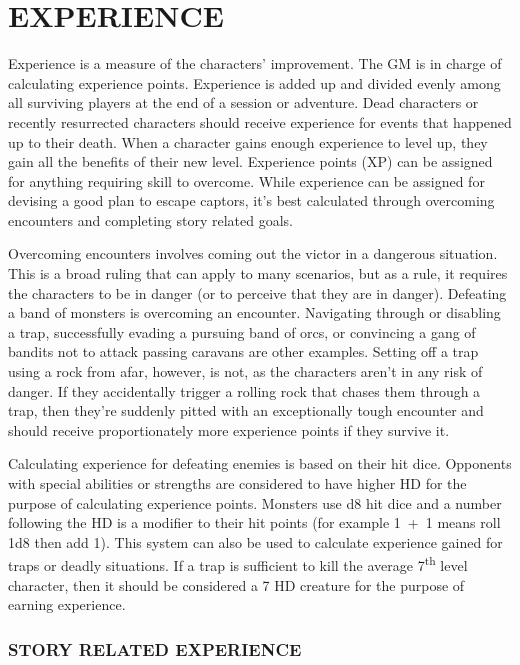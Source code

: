\chapter{EXPERIENCE}

\begin{multicols}{2}

Experience is a measure of the characters' improvement.  The GM is in charge of calculating experience points.  Experience is added up and divided evenly among all surviving players at the end of a session or adventure.  Dead characters or recently resurrected characters should receive experience for events that happened up to their death.  When a character gains enough experience to level up, they gain all the benefits of their new level.  Experience points (XP) can be assigned for anything requiring skill to overcome.  While experience can be assigned for devising a good plan to escape captors, it's best calculated through overcoming encounters and completing story related goals.

Overcoming encounters involves coming out the victor in a dangerous situation.  This is a broad ruling that can apply to many scenarios, but as a rule, it requires the characters to be in danger (or to perceive that they are in danger).  Defeating a band of monsters is overcoming an encounter.  Navigating through or disabling a trap, successfully evading a pursuing band of orcs, or convincing a gang of bandits not to attack passing caravans are other examples.  Setting off a trap using a rock from afar, however, is not, as the characters aren't in any risk of danger.  If they accidentally trigger a rolling rock that chases them through a trap, then they're suddenly pitted with an exceptionally tough encounter and should receive proportionately more experience points if they survive it.

Calculating experience for defeating enemies is based on their hit dice.  Opponents with special abilities or strengths are considered to have higher HD for the purpose of calculating experience points.  Monsters use d8 hit dice and a number following the HD is a modifier to their hit points (for example 1~+~1 means roll 1d8 then add 1).  This system can also be used to calculate experience gained for traps or deadly situations.  If a trap is sufficient to kill the average 7\textsuperscript{th} level character, then it should be considered a 7 HD creature for the purpose of earning experience.

\subsection{STORY RELATED EXPERIENCE}


\end{multicols}
